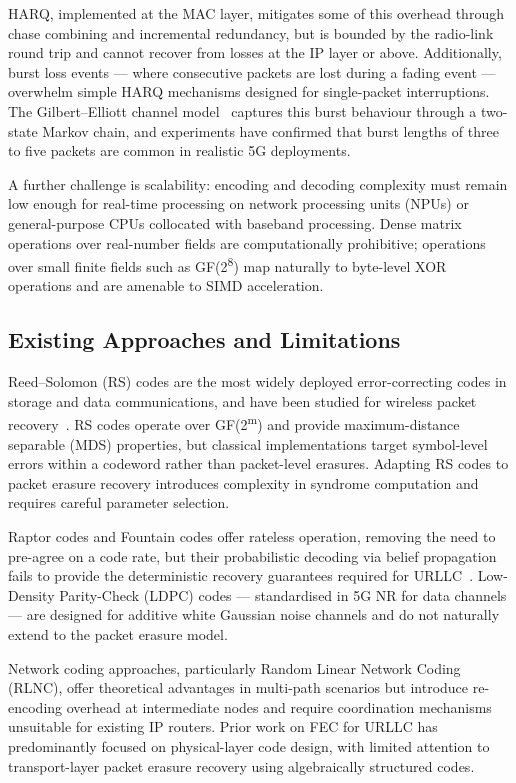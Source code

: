 \documentclass[conference]{IEEEtran}
\begin{document}
HARQ, implemented at the MAC layer, mitigates some of this overhead
through chase combining and incremental redundancy, but is bounded by
the radio-link round trip and cannot recover from losses at the IP layer
or above. Additionally, burst loss events --- where consecutive packets
are lost during a fading event --- overwhelm simple HARQ mechanisms
designed for single-packet interruptions. The Gilbert--Elliott channel
model~\cite{gilbert1960} captures this burst behaviour through a
two-state Markov chain, and experiments have confirmed that burst lengths
of three to five packets are common in realistic 5G deployments.

A further challenge is scalability: encoding and decoding complexity
must remain low enough for real-time processing on network processing
units (NPUs) or general-purpose CPUs collocated with baseband
processing. Dense matrix operations over real-number fields are
computationally prohibitive; operations over small finite fields such as
GF(2\textsuperscript{8}) map naturally to byte-level XOR operations and
are amenable to SIMD acceleration.

\subsection{Existing Approaches and Limitations}

Reed--Solomon (RS) codes are the most widely deployed error-correcting
codes in storage and data communications, and have been studied for
wireless packet recovery~\cite{reedsolomon1960}. RS codes operate over
GF(2\textsuperscript{m}) and provide maximum-distance separable (MDS)
properties, but classical implementations target symbol-level errors
within a codeword rather than packet-level erasures. Adapting RS codes
to packet erasure recovery introduces complexity in syndrome computation
and requires careful parameter selection.

Raptor codes and Fountain codes offer rateless operation, removing the
need to pre-agree on a code rate, but their probabilistic decoding via
belief propagation fails to provide the deterministic recovery guarantees
required for URLLC~\cite{shokrollahi2006raptor}. Low-Density
Parity-Check (LDPC) codes --- standardised in 5G NR for data channels
--- are designed for additive white Gaussian noise channels and do not
naturally extend to the packet erasure model.

Network coding approaches, particularly Random Linear Network Coding
(RLNC), offer theoretical advantages in multi-path scenarios but
introduce re-encoding overhead at intermediate nodes and require
coordination mechanisms unsuitable for existing IP routers. Prior work
on FEC for URLLC has predominantly focused on physical-layer code
design, with limited attention to transport-layer packet erasure
recovery using algebraically structured codes.
\end{document}

